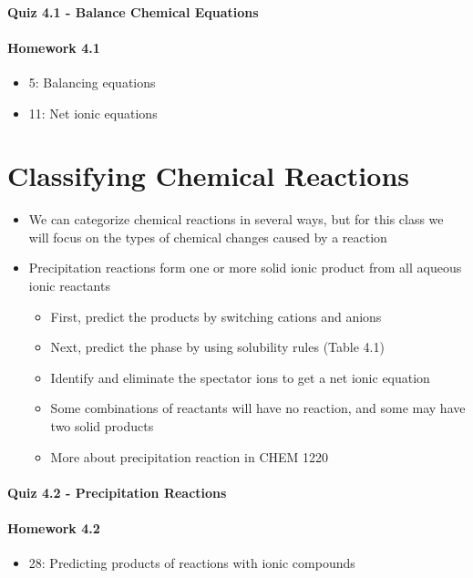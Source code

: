 \documentclass[12pt, openany, letterpaper]{memoir}
\begin{document}
\paragraph*{Quiz 4.1 - Balance Chemical Equations}
\paragraph*{Homework 4.1}
\begin{itemize}
  \item 5: Balancing equations 
  \item 11: Net ionic equations
\end{itemize}

\section{Classifying Chemical Reactions}
\begin{itemize}
  \item We can categorize chemical reactions in several ways, but for this class we will focus on the types of chemical changes caused by a reaction
  \item Precipitation reactions form one or more solid ionic product from all aqueous ionic reactants
    \begin{itemize}
      \item First, predict the products by switching cations and anions
      \item Next, predict the phase by using solubility rules (Table 4.1)
      \item Identify and eliminate the spectator ions to get a net ionic equation
      \item Some combinations of reactants will have no reaction, and some may have two solid products
      \item More about precipitation reaction in CHEM 1220
    \end{itemize}
\end{itemize}

\paragraph*{Quiz 4.2 - Precipitation Reactions}
\paragraph*{Homework 4.2}
\begin{itemize}
  \item 28: Predicting products of reactions with ionic compounds
\end{itemize}
\end{document}
